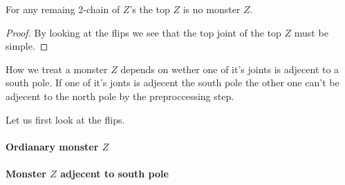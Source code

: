   \begin{lemma}
    \label{lm:}
    For any remaing 2-chain of $Z$'s the top $Z$ is no monster $Z$.
  \end{lemma}

  \begin{proof}
    By looking at the flips we see that the top joint of the top $Z$ must be simple.
  \end{proof}


  How we treat a monster $Z$ depends on wether one of it's joints is adjecent to a south pole.
  If one of it's jonts is adjecent the south pole the other one can't be adjecent to the north pole by the preproccessing step.

  Let us first look at the flips.

  \paragraph{Ordianary monster $Z$}

  \paragraph{Monster $Z$ adjecent to south pole}

